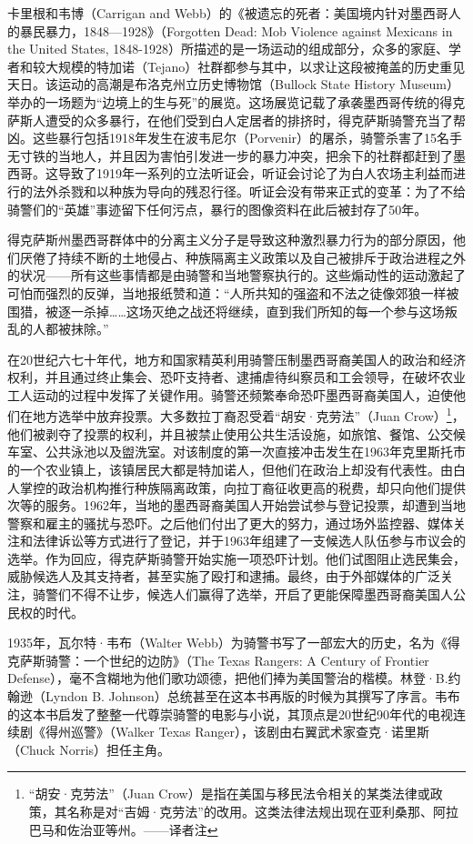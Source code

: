 \documentclass[fontset=fandol, a4paper, 12pt, openright]{ctexbook}
\begin{document}
卡里根和韦博（Carrigan and Webb）的《被遗忘的死者：美国境内针对墨西哥人的暴民暴力，1848—1928》（Forgotten Dead: Mob Violence against Mexicans in the United States, 1848-1928）所描述的是一场运动的组成部分，众多的家庭、学者和较大规模的特加诺（Tejano）社群都参与其中，以求让这段被掩盖的历史重见天日。该运动的高潮是布洛克州立历史博物馆（Bullock State History Museum）举办的一场题为“边境上的生与死”的展览。这场展览记载了承袭墨西哥传统的得克萨斯人遭受的众多暴行，在他们受到白人定居者的排挤时，得克萨斯骑警充当了帮凶。这些暴行包括1918年发生在波韦尼尔（Porvenir）的屠杀，骑警杀害了15名手无寸铁的当地人，并且因为害怕引发进一步的暴力冲突，把余下的社群都赶到了墨西哥。这导致了1919年一系列的立法听证会，听证会讨论了为白人农场主利益而进行的法外杀戮和以种族为导向的残忍行径。听证会没有带来正式的变革：为了不给骑警们的“英雄”事迹留下任何污点，暴行的图像资料在此后被封存了50年。

得克萨斯州墨西哥群体中的分离主义分子是导致这种激烈暴力行为的部分原因，他们厌倦了持续不断的土地侵占、种族隔离主义政策以及自己被排斥于政治进程之外的状况——所有这些事情都是由骑警和当地警察执行的。这些煽动性的运动激起了可怕而强烈的反弹，当地报纸赞和道：“人所共知的强盗和不法之徒像郊狼一样被围猎，被逐一杀掉……这场灭绝之战还将继续，直到我们所知的每一个参与这场叛乱的人都被抹除。”

在20世纪六七十年代，地方和国家精英利用骑警压制墨西哥裔美国人的政治和经济权利，并且通过终止集会、恐吓支持者、逮捕虐待纠察员和工会领导，在破坏农业工人运动的过程中发挥了关键作用。骑警还频繁奉命恐吓墨西哥裔美国人，迫使他们在地方选举中放弃投票。大多数拉丁裔忍受着“胡安·克劳法”（Juan Crow）\footnote{“胡安·克劳法”（Juan Crow）是指在美国与移民法令相关的某类法律或政策，其名称是对“吉姆·克劳法”的改用。这类法律法规出现在亚利桑那、阿拉巴马和佐治亚等州。——译者注}，他们被剥夺了投票的权利，并且被禁止使用公共生活设施，如旅馆、餐馆、公交候车室、公共泳池以及盥洗室。对该制度的第一次直接冲击发生在1963年克里斯托市的一个农业镇上，该镇居民大都是特加诺人，但他们在政治上却没有代表性。由白人掌控的政治机构推行种族隔离政策，向拉丁裔征收更高的税费，却只向他们提供次等的服务。1962年，当地的墨西哥裔美国人开始尝试参与登记投票，却遭到当地警察和雇主的骚扰与恐吓。之后他们付出了更大的努力，通过场外监控器、媒体关注和法律诉讼等方式进行了登记，并于1963年组建了一支候选人队伍参与市议会的选举。作为回应，得克萨斯骑警开始实施一项恐吓计划。他们试图阻止选民集会，威胁候选人及其支持者，甚至实施了殴打和逮捕。最终，由于外部媒体的广泛关注，骑警们不得不让步，候选人们赢得了选举，开启了更能保障墨西哥裔美国人公民权的时代。

1935年，瓦尔特·韦布（Walter Webb）为骑警书写了一部宏大的历史，名为《得克萨斯骑警：一个世纪的边防》（The Texas Rangers: A Century of Frontier Defense），毫不含糊地为他们歌功颂德，把他们捧为美国警治的楷模。林登·B.约翰逊（Lyndon B. Johnson）总统甚至在这本书再版的时候为其撰写了序言。韦布的这本书启发了整整一代尊崇骑警的电影与小说，其顶点是20世纪90年代的电视连续剧《得州巡警》（Walker Texas Ranger），该剧由右翼武术家查克·诺里斯（Chuck Norris）担任主角。
\end{document}
